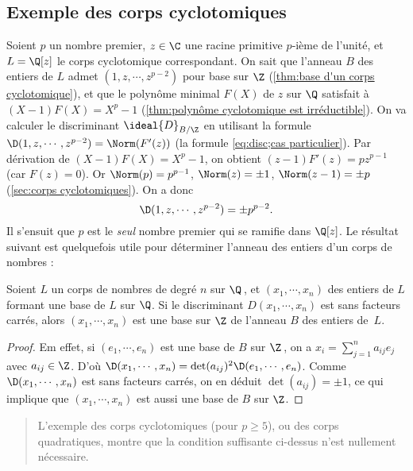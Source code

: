 \documentclass[11pt, useosf,
  title in boldface,
  theorem in new line,
  theorem numbering = section,
  number theorems separately,
]{simplivre}
\begin{document}
    \subsection*{Exemple des corps cyclotomiques}
        Soient \( p \) un nombre premier, \( z \in \C \) une racine primitive \( p \)‑ième de l'unité, et \( L = \Q[z] \) le corps cyclotomique correspondant. On sait que l'anneau \( B \) des entiers de \( L \) admet \( (1, z, \cdots, z^{p-2}) \) pour base sur \( \Z \) (\cref{thm:base d'un corps cyclotomique}), et que le polynôme minimal \( F(X) \) de \( z \) sur \( \Q \) satisfait à \( (X-1)F(X) = X^p-1 \) (\cref{thm:polynôme cyclotomique est irréductible}). On va calculer le discriminant \( \ideal{D}_{B/\Z} \) en utilisant la formule \( \D(1, z, \cdots, z^{p-2}) = \Norm(F'(z)) \) (la formule \eqref{eq:disc;cas particulier}). Par dérivation de \( (X-1)F(X) = X^p-1 \), on obtient \( (z-1)F'(z) = p z^{p-1} \) (car \( F(z) = 0 \)). Or \( \Norm(p) = p^{p-1} \), \( \Norm(z) = \pm 1 \), \( \Norm(z-1) = \pm p \) (\cref{sec:corps cyclotomiques}). On a donc
        \begin{equation}
            \D(1, z, \cdots, z^{p-2}) = \pm p^{p-2}.
        \end{equation}
        Il s'ensuit que \( p \) est le \emph{seul} nombre premier qui se ramifie dans \( \Q[z] \). Le résultat suivant est quelquefois utile pour déterminer l'anneau des entiers d'un corps de nombres :
        \begin{proposition}
            Soient \( L \) un corps de nombres de degré \( n \) sur \( \Q \)\,, et \( (x_1, \cdots, x_n) \) des entiers de \( L \) formant une base de \( L \) sur \( \Q \). Si le discriminant \( D(x_1, \cdots, x_n) \) est sans facteurs carrés, alors \( (x_1, \cdots, x_n) \) est une base sur \( \Z \) de l'anneau \( B \) des entiers de~\( L \).
        \end{proposition}
        \begin{proof}
            Em effet, si \( (e_1, \cdots, e_n) \) est une base de \( B \) sur \( \Z \)\,, on a \( x_i = \sum_{j=1}^n a_{ij} e_j \) avec \( a_{ij} \in \Z \). D'où \( \D(x_1, \cdots, x_n) = \det(a_{ij})^2 \D(e_1, \cdots, e_n) \). Comme \( \D(x_1, \cdots, x_n) \) est sans facteurs carrés, on en déduit \( \det(a_{ij}) = \pm 1 \), ce qui implique que \( (x_1, \cdots, x_n) \) est aussi une base de \( B \) sur \( \Z \).
        \end{proof}

        \begin{quote}
            L'exemple des corps cyclotomiques (pour \( p \geqslant 5 \)), ou des corps quadratiques, montre que la condition suffisante ci-dessus n'est nullement nécessaire.
        \end{quote}
\end{document}
